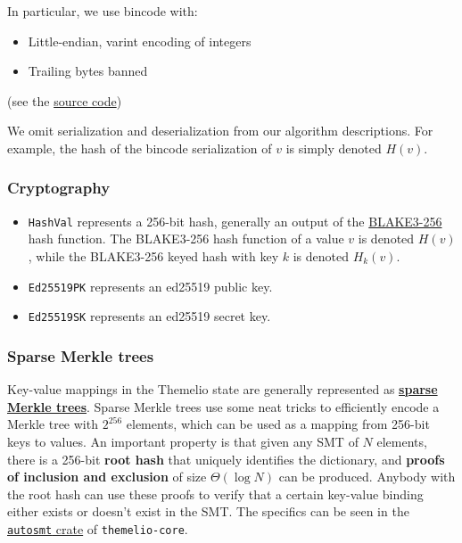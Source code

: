 \documentclass[
]{article}
\newcommand{\passthrough}[1]{#1}
\providecommand{\tightlist}{%
  \setlength{\itemsep}{0pt}\setlength{\parskip}{0pt}}
\begin{document}
In particular, we use bincode with:

\begin{itemize}
  \tightlist
  \item
        Little-endian, varint encoding of integers
  \item
        Trailing bytes banned
\end{itemize}

(see the
\href{https://github.com/themeliolabs/themelio-core/blob/master/libs/stdcode/src/lib.rs}{source
  code})

We omit serialization and deserialization from our algorithm
descriptions. For example, the hash of the bincode serialization of
\(v\) is simply denoted \(H(v)\).

\hypertarget{cryptography}{%
  \subsubsection{Cryptography}\label{cryptography}}

\begin{itemize}
  \tightlist
  \item
        \passthrough{\lstinline!HashVal!} represents a 256-bit hash, generally
        an output of the
        \href{https://github.com/BLAKE3-team/BLAKE3}{BLAKE3-256} hash
        function. The BLAKE3-256 hash function of a value \(v\) is denoted
        \(H(v)\), while the BLAKE3-256 keyed hash with key \(k\) is denoted
        \(H_k(v)\).
  \item
        \passthrough{\lstinline!Ed25519PK!} represents an ed25519 public key.
  \item
        \passthrough{\lstinline!Ed25519SK!} represents an ed25519 secret key.
\end{itemize}

\hypertarget{sparse-merkle-trees}{%
  \subsubsection{Sparse Merkle trees}\label{sparse-merkle-trees}}

Key-value mappings in the Themelio state are generally represented as
\href{https://ethresear.ch/t/optimizing-sparse-merkle-trees/3751}{\textbf{sparse
    Merkle trees}}. Sparse Merkle trees use some neat tricks to efficiently
encode a Merkle tree with \(2^{256}\) elements, which can be used as a
mapping from 256-bit keys to values. An important property is that given
any SMT of \(N\) elements, there is a 256-bit \textbf{root hash} that
uniquely identifies the dictionary, and \textbf{proofs of inclusion and
  exclusion} of size \(\Theta(\log N)\) can be produced. Anybody with the
root hash can use these proofs to verify that a certain key-value
binding either exists or doesn't exist in the SMT. The specifics can be
seen in the
\href{https://github.com/themeliolabs/themelio-core/tree/master/libs/autosmt}{\passthrough{\lstinline!autosmt!}
  crate} of \passthrough{\lstinline!themelio-core!}.
\end{document}
